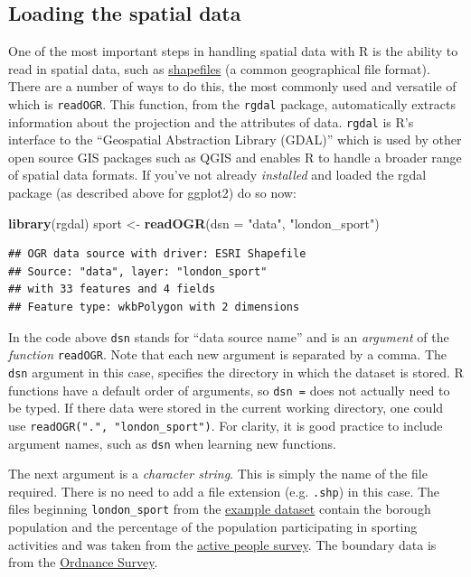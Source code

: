\documentclass[]{article}
\newenvironment{Shaded}{}{}
\newcommand{\KeywordTok}[1]{\textcolor[rgb]{0.00,0.44,0.13}{\textbf{{#1}}}}
\newcommand{\DataTypeTok}[1]{\textcolor[rgb]{0.56,0.13,0.00}{{#1}}}
\newcommand{\StringTok}[1]{\textcolor[rgb]{0.25,0.44,0.63}{{#1}}}
\newcommand{\NormalTok}[1]{{#1}}
\begin{document}
\subsection{Loading the spatial data}\label{loading-the-spatial-data}

One of the most important steps in handling spatial data with R is the
ability to read in spatial data, such as
\href{http://en.wikipedia.org/wiki/Shapefile}{shapefiles} (a common
geographical file format). There are a number of ways to do this, the
most commonly used and versatile of which is \texttt{readOGR}. This
function, from the \texttt{rgdal} package, automatically extracts
information about the projection and the attributes of data.
\texttt{rgdal} is R's interface to the ``Geospatial Abstraction Library
(GDAL)'' which is used by other open source GIS packages such as QGIS
and enables R to handle a broader range of spatial data formats. If
you've not already \emph{installed} and loaded the rgdal package (as
described above for ggplot2) do so now:

\begin{Shaded}
\begin{Highlighting}[]
\KeywordTok{library}\NormalTok{(rgdal)}
\NormalTok{sport <-}\StringTok{ }\KeywordTok{readOGR}\NormalTok{(}\DataTypeTok{dsn =} \StringTok{"data"}\NormalTok{, }\StringTok{"london_sport"}\NormalTok{)}
\end{Highlighting}
\end{Shaded}

\begin{verbatim}
## OGR data source with driver: ESRI Shapefile 
## Source: "data", layer: "london_sport"
## with 33 features and 4 fields
## Feature type: wkbPolygon with 2 dimensions
\end{verbatim}

In the code above \texttt{dsn} stands for ``data source name'' and is an
\emph{argument} of the \emph{function} \texttt{readOGR}. Note that each
new argument is separated by a comma. The \texttt{dsn} argument in this
case, specifies the directory in which the dataset is stored. R
functions have a default order of arguments, so \texttt{dsn =} does not
actually need to be typed. If there data were stored in the current
working directory, one could use \texttt{readOGR(".", "london\_sport")}.
For clarity, it is good practice to include argument names, such as
\texttt{dsn} when learning new functions.

The next argument is a \emph{character string}. This is simply the name
of the file required. There is no need to add a file extension (e.g.
\texttt{.shp}) in this case. The files beginning \texttt{london\_sport}
from the
\href{http://spatial.ly/wp-content/uploads/2013/12/spatialggplot.zip}{example
dataset} contain the borough population and the percentage of the
population participating in sporting activities and was taken from the
\href{http://data.london.gov.uk/datastore/package/active-people-survey-kpi-data-borough}{active
people survey}. The boundary data is from the
\href{http://www.ordnancesurvey.co.uk/oswebsite/opendata/}{Ordnance
Survey}.
\end{document}
